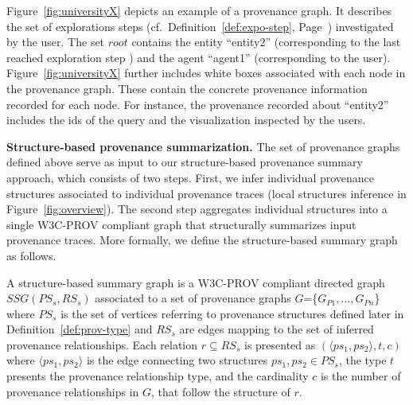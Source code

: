     Figure~\ref{fig:universityX} depicts an example of a provenance graph.
    It describes the set of explorations steps (cf.~Definition~\ref{def:expo-step}, Page~\pageref{def:expo-step}) investigated  by the user. The set  $root$ contains the entity ``entity2'' (corresponding to the last reached exploration step )  and  the agent ``agent1'' (corresponding to the user). Figure~\ref{fig:universityX} further includes white boxes associated with each node in the provenance graph. These contain the concrete provenance information recorded for each node. For instance, the provenance recorded about ``entity2'' includes the ids of the query and the visualization inspected by the users.

\smallskip


\noindent \textbf{Structure-based provenance summarization. } The set of provenance graphs defined above serve as input to our structure-based provenance summary approach, which consists of two steps. First, we infer individual provenance structures associated to individual provenance traces (local structures inference in Figure~\ref{fig:overview}). The second step aggregates individual structures into a single W3C-PROV compliant graph that structurally summarizes input provenance traces. 
More formally, we define the structure-based summary graph as follows.


\begin{definition}A structure-based summary graph is a W3C-PROV compliant directed graph $SSG(PS_s, RS_s)$ associated to a set of provenance graphs $G$=\{$G_{P1}, \ldots,G_{Pn}$\} where $PS_s$ is the set of vertices referring to provenance structures defined later in Definition~\ref{def:prov-type} and $RS_s$ are edges mapping to the set of inferred provenance relationships. %
Each relation $r \subseteq RS_s$ is presented as $ (\langle ps_{1},ps_{2}\rangle,t,c)$ where  $\langle ps_{1},ps_{2}\rangle$ is the edge connecting two structures $ps_1, ps_2 \in PS_s$, the type $t$ presents the provenance relationship type, and the cardinality $c$ is the number of provenance relationships in $G$, that follow the structure of $r$.
\end{definition}


